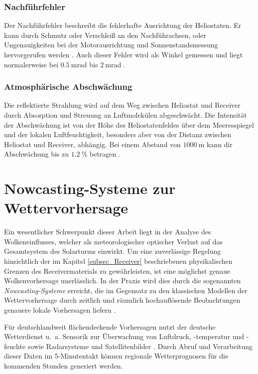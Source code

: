 \subsubsection*{Nachführfehler} \label{subsubsec_Nachführfehler}
Der Nachführfehler beschreibt die fehlerhafte Ausrichtung der Heliostaten.
Er kann durch Schmutz oder Verschleiß an den Nachführachsen, oder Ungenauigkeiten bei der Motorausrichtung und Sonnenstandsmessung hervorgerufen werden \cite[S.7]{Richter}. Auch dieser Fehler wird als Winkel gemessen und liegt normalerweise bei $\SI{0.5}{\milli\radian}$ bis $\SI{2}{\milli\radian}$ \cite[S.17]{DissBelhomme}.

\subsubsection*{Atmosphärische Abschwächung} \label{subsubsec_AtmosphärischeAbschwächung}
Die reflektierte Strahlung wird auf dem Weg zwischen Heliostat und Receiver durch Absorption und Streuung an Luftmolekülen abgeschwächt.
Die Intensität der Abschwächung ist von der Höhe des Heliostatenfeldes über dem Meeresspiegel und der lokalen Luftfeuchtigkeit, besonders aber von der Distanz zwischen Heliostat und Receiver, abhängig.
Bei einem Abstand von $\SI{1000}{\metre}$ kann dir Abschwächung bis zu $\SI{1.2}{\percent}$ betragen \cite[S.121]{Biggs}\cite[S.17]{DissBelhomme}.



\section{Nowcasting-Systeme zur Wettervorhersage} \label{sec_Nowcasting}
Ein wesentlicher Schwerpunkt dieser Arbeit liegt in der Analyse des Wolkeneinflusses, welcher als meteorologischer optischer Verlust auf das Gesamtsystem des Solarturms einwirkt.
Um eine zuverlässige Regelung hinsichtlich der im Kapitel \ref{subsec_Receiver} beschriebenen physikalischen Grenzen des Receivermaterials zu gewährleisten, ist eine möglichst genaue Wolkenvorhersage unerlässlich.
In der Praxis wird dies durch die sogenannten \textit{Nowcasting-Systeme} erreicht, die im Gegensatz zu den klassischen Modellen der Wettervorhersage durch zeitlich und räumlich hochauflösende Beobachtungen genauere lokale Vorhersagen liefern \cite{DWD1}.

Für deutschlandweit flächendeckende Vorhersagen nutzt der deutsche Wetterdienst u.~a. Sensorik zur Überwachung von Luftdruck, -temperatur und -feuchte sowie Radarsysteme und Satellitenbilder \cite{DWD1}\cite{DWD0}.
Durch Abruf und Verarbeitung dieser Daten im 5-Minutentakt können regionale Wetterprognosen für die kommenden Stunden generiert werden.

